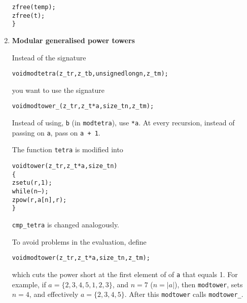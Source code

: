 \begin{enumerate}[label=\textbf{\arabic*}.]
\begin{alltt}
    zfree(temp);
    zfree(t);
\}
\end{alltt}
\vspace{-1em}



\item \textbf{Modular generalised power towers}

Instead of the signature

\vspace{-1em}
\begin{alltt}
   void modtetra(z_t r, z_t b, unsigned long n, z_t m);
\end{alltt}
\vspace{-1em}

\noindent
you want to use the signature

\vspace{-1em}
\begin{alltt}
   void modtower_(z_t r, z_t *a, size_t n, z_t m);
\end{alltt}
\vspace{-1em}

Instead of using, \texttt{b} (in \texttt{modtetra}),
use \texttt{*a}. At every recursion, instead of
passing on \texttt{a}, pass on \texttt{a + 1}.

The function \texttt{tetra} is modified into

\vspace{-1em}
\begin{alltt}
   void tower(z_t r, z_t *a, size_t n)
   \{
       zsetu(r, 1);
       while (n--);
           zpow(r, a[n], r);
   \}
\end{alltt}
\vspace{-1em}

\noindent
\texttt{cmp\_tetra} is changed analogously.

To avoid problems in the evaluation, define

\vspace{-1em}
\begin{alltt}
   void modtower(z_t r, z_t *a, size_t n, z_t m);
\end{alltt}
\vspace{-1em}

\noindent
which cuts the power short at the first element
of of \texttt{a} that equals 1. For example, if
$a = \{2, 3, 4, 5, 1, 2, 3\}$, and $n = 7$
($n = |a|$), then \texttt{modtower}, sets $n = 4$,
and effectively $a = \{2, 3, 4, 5\}$. After this
\texttt{modtower} calls \texttt{modtower\_}.



\end{enumerate}
